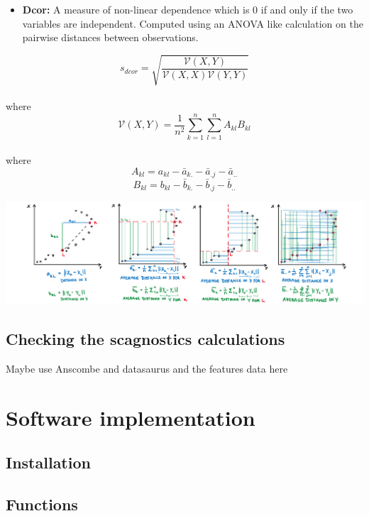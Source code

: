 \begin{itemize}
\tightlist
\item
  \textbf{Dcor:} A measure of non-linear dependence which is 0 if and
  only if the two variables are independent. Computed using an ANOVA
  like calculation on the pairwise distances between observations.
\end{itemize}

\[s_{dcor}= \sqrt{\frac{\mathcal{V}(X,Y)}{\mathcal{V}(X,X)\mathcal{V}(Y,Y)}}\]\\
where \[\mathcal{V}
(X,Y)=\frac{1}{n^2}\sum_{k=1}^n\sum_{l=1}^nA_{kl}B_{kl}\]\\
where \[A_{kl}=a_{kl}-\bar{a}_{k.}-\bar{a}_{.j}-\bar{a}_{..}\]
\[B_{kl}=b_{kl}-\bar{b}_{k.}-\bar{b}_{.j}-\bar{b}_{..}\]

\includegraphics{figures/drawdcor.png}

\hypertarget{checking-the-scagnostics-calculations}{%
\subsection{Checking the scagnostics
calculations}\label{checking-the-scagnostics-calculations}}

Maybe use Anscombe and datasaurus and the features data here

\hypertarget{software-implementation}{%
\section{Software implementation}\label{software-implementation}}

\hypertarget{installation}{%
\subsection{Installation}\label{installation}}

\hypertarget{functions}{%
\subsection{Functions}\label{functions}}

